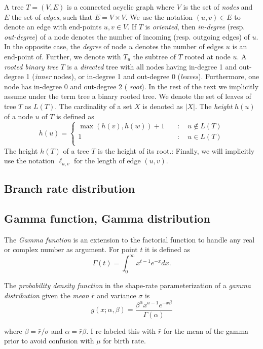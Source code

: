 \documentclass{llncs}
\newcommand{\ejmcomment}[1]{{\color{green} #1}}
\begin{document}
A tree $T=(V,E)$ is a connected acyclic graph where $V$ is the set of {\em
nodes} and $E$ the set of {\em edges}, such that $E = V\times V$. We use the
notation $(u,v) \in E$ to denote an edge with end-points $u,v \in V$. If $T$ is
{\em oriented}, then {\em in-degree} (resp. {\em out-degree}) of a node denotes
the number of incoming (resp. outgoing edges) of $u$. In the opposite case, the
{\em degree} of node $u$ denotes the number of edges $u$ is an end-point of.
Further, we denote with $T_u$ the subtree of $T$ rooted at node $u$.  A {\em
rooted binary tree} $T$ is a {\em directed} tree with all nodes having
in-degree 1 and out-degree 1 ({\em inner} nodes), or in-degree 1 and out-degree
0 ({\em leaves}). Furthermore, one node has in-degree 0 and out-degree 2 ({\em
root}).  In the rest of the text we implicitly assume under the term tree a
binary rooted tree.  We denote the set of leaves of tree $T$ as $L(T)$.  The
cardinality of a set $X$ is denoted as $|X|$. The {\em height} $h(u)$ of a node
$u$ of $T$ is defined as 
%
\[ h(u) = \left\{ \begin{array}{ll}
\max(h(v), h(w)) + 1 & \quad : \quad u \notin L(T)\\
1                    & \quad : \quad u    \in L(T)\\
\end{array}\right. \] 
The height $h(T)$ of a tree $T$ is the height of its root.: Finally, we will
implicitly use the notation $\ell_{u,v}$ for the length of edge $(u,v)$.

\subsection{Branch rate distribution}
\subsection{Gamma function, Gamma distribution}

The {\em Gamma function} is an extension to the factorial function to handle
any real or complex number as argument. For point $t$ it is defined as
$$\Gamma(t) = \int_0^\infty x^{t-1} e^{-x} dx.$$

The {\em probability density function} in the shape-rate parameterization of a
{\em gamma distribution} given the {\em mean} $\bar{r}$ and variance $\sigma$ is
$$ g(x;\alpha,\beta) = \frac{\beta^{\alpha}x^{a-1}e^{-x\beta}}{\Gamma(\alpha)} $$

where $\beta = \bar{r} / \sigma$ and $\alpha = \bar{r} \beta$.
\ejmcomment{I re-labeled this with $\bar{r}$ for the mean of the gamma prior to avoid confusion with $\mu$ for birth rate.}
\end{document}
